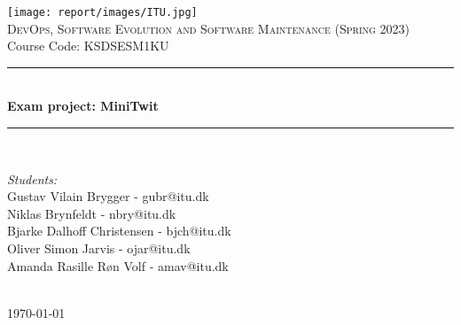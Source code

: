 \documentclass{article}
\begin{document}

\begin{titlepage}

\newcommand{\HRule}{\rule{\linewidth}{0.5mm}} 
\center


\texttt{[image: report/images/ITU.jpg]}\\[3cm]

\textsc{\LARGE DevOps, Software Evolution and Software Maintenance (Spring 2023)}\\[0.5cm] %
Course Code: KSDSESM1KU\\[1cm]


\HRule \\[0.8cm]
{ \huge \bfseries Exam project: MiniTwit }\\[0.4cm] %
\HRule \\[1.5cm]


\begin{minipage}{0.6\textwidth}
    \center
    \emph{Students:}\\
    Gustav Vilain Brygger - gubr@itu.dk \\
    Niklas Brynfeldt - nbry@itu.dk \\
    Bjarke Dalhoff Christensen - bjch@itu.dk \\
    Oliver Simon Jarvis - ojar@itu.dk \\
    Amanda Rasille Røn Volf - amav@itu.dk \\

\end{minipage}\\[2cm]

{\large \today}\\[2cm]

\vfill %

\end{titlepage}
\end{document}
